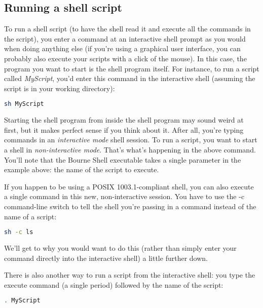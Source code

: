 \subsection{Running a shell script}
To run a shell script (to have the shell read it and execute all the commands
in the script), you enter a command at an interactive shell prompt as you would
when doing anything else (if you're using a graphical user interface, you can
probably also execute your scripts with a click of the mouse). In this case,
the program you want to start is the shell program itself. For instance, to run
a script called \textit{MyScript}, you'd enter this command in the interactive
shell (assuming the script is in your working directory):
\lstset{basicstyle=\scriptsize, numbers=left, captionpos=b, tabsize=4}
\begin{lstlisting}[caption=Running a script,language={bash},
xleftmargin=15pt, label=lst:Running a script]
sh MyScript
\end{lstlisting}

Starting the shell program from inside the shell program may sound weird at
first,  but it makes perfect sense if you think about it. After all, you're
typing commands in an \textit{interactive mode} shell session. To run a script,
you want to start a shell in \textit{non-interactive mode}. That's what's
happening in the above command. You'll note that the Bourne Shell executable
takes a single parameter in the example above: the name of the script to
execute.

If you happen to be using a POSIX 1003.1-compliant shell, you can also execute
a single command in this new, non-interactive session. You have to use the -c
command-line switch to tell the shell you're passing in a command instead of
the name of a script:
\lstset{basicstyle=\scriptsize, numbers=left, captionpos=b, tabsize=4}
\begin{lstlisting}[caption=Running a command in a new shell,language={bash},
xleftmargin=15pt, label=lst:Running a command in a new shell]
sh -c ls
\end{lstlisting}

We'll get to why you would want to do this (rather than simply enter your
command directly into the interactive shell) a little further down.

There is also another way to run a script from the interactive shell: you type
the execute command (a single period) followed  by the name of the script:
\lstset{basicstyle=\scriptsize, numbers=left, captionpos=b, tabsize=4}
\begin{lstlisting}[caption=Sourcing a script,language={bash},
xleftmargin=15pt, label=lst:Sourcing a script]
. MyScript
\end{lstlisting}

